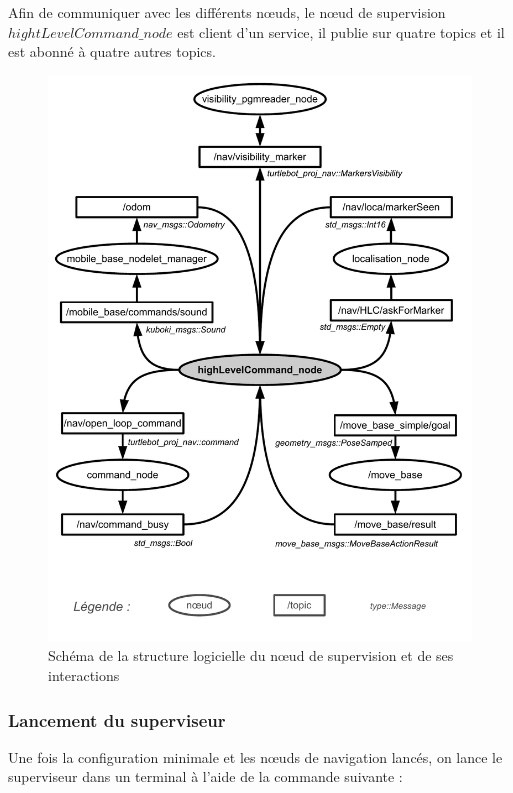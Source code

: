 \documentclass[10pt,a4paper]{article}
\begin{document}
Afin de communiquer avec les différents nœuds, le nœud de supervision $hightLevelCommand\_node$ est client d'un service, il publie sur quatre topics et il est abonné à quatre autres topics.


\begin{figure}[!h]
\centering\includegraphics[scale=0.6]{figures/HLC_ROS_struc.pdf}
\caption{Schéma de la structure logicielle du nœud de supervision et de ses interactions }
\label{HLC_ROS_struc}
\end{figure}

\subsubsection{Lancement du superviseur}
\label{sec:LancementDuSuperviseur}

Une fois la configuration minimale et les nœuds de navigation lancés, on lance le superviseur dans un terminal à l'aide de la commande suivante :
\end{document}
